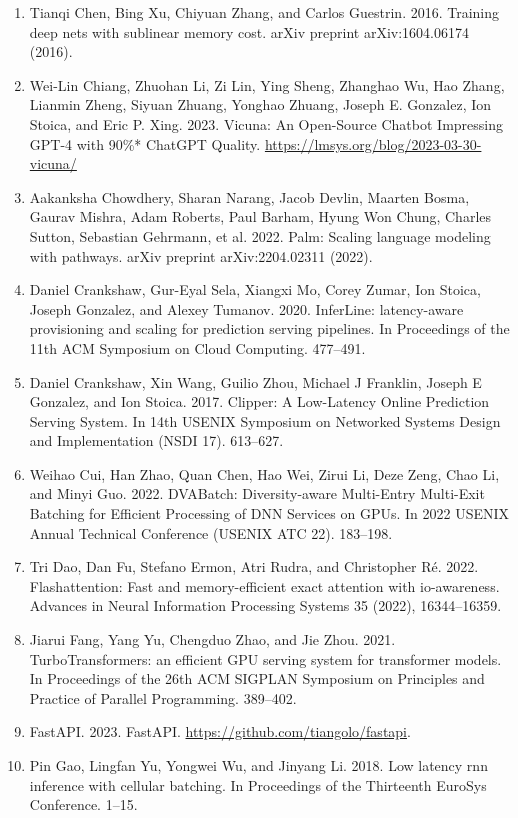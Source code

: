 \documentclass[11pt,UTF8,fontset=fandol]{ctexart}
\begin{document}
\begin{enumerate}[leftmargin=2.2em,labelsep=0.6em,itemsep=0.25em]
\item Tianqi Chen, Bing Xu, Chiyuan Zhang, and Carlos Guestrin. 2016. Training deep nets with sublinear memory cost. arXiv preprint arXiv:1604.06174 (2016).
\item Wei-Lin Chiang, Zhuohan Li, Zi Lin, Ying Sheng, Zhanghao Wu, Hao Zhang, Lianmin Zheng, Siyuan Zhuang, Yonghao Zhuang, Joseph E. Gonzalez, Ion Stoica, and Eric P. Xing. 2023. Vicuna: An Open-Source Chatbot Impressing GPT-4 with 90\%* ChatGPT Quality. \url{https://lmsys.org/blog/2023-03-30-vicuna/}
\item Aakanksha Chowdhery, Sharan Narang, Jacob Devlin, Maarten Bosma, Gaurav Mishra, Adam Roberts, Paul Barham, Hyung Won Chung, Charles Sutton, Sebastian Gehrmann, et al. 2022. Palm: Scaling language modeling with pathways. arXiv preprint arXiv:2204.02311 (2022).
\item Daniel Crankshaw, Gur-Eyal Sela, Xiangxi Mo, Corey Zumar, Ion Stoica, Joseph Gonzalez, and Alexey Tumanov. 2020. InferLine: latency-aware provisioning and scaling for prediction serving pipelines. In Proceedings of the 11th ACM Symposium on Cloud Computing. 477--491.
\item Daniel Crankshaw, Xin Wang, Guilio Zhou, Michael J Franklin, Joseph E Gonzalez, and Ion Stoica. 2017. Clipper: A Low-Latency Online Prediction Serving System. In 14th USENIX Symposium on Networked Systems Design and Implementation (NSDI 17). 613--627.
\item Weihao Cui, Han Zhao, Quan Chen, Hao Wei, Zirui Li, Deze Zeng, Chao Li, and Minyi Guo. 2022. DVABatch: Diversity-aware Multi-Entry Multi-Exit Batching for Efficient Processing of DNN Services on GPUs. In 2022 USENIX Annual Technical Conference (USENIX ATC 22). 183--198.
\item Tri Dao, Dan Fu, Stefano Ermon, Atri Rudra, and Christopher Ré. 2022. Flashattention: Fast and memory-efficient exact attention with io-awareness. Advances in Neural Information Processing Systems 35 (2022), 16344--16359.
\item Jiarui Fang, Yang Yu, Chengduo Zhao, and Jie Zhou. 2021. TurboTransformers: an efficient GPU serving system for transformer models. In Proceedings of the 26th ACM SIGPLAN Symposium on Principles and Practice of Parallel Programming. 389--402.
\item FastAPI. 2023. FastAPI. \url{https://github.com/tiangolo/fastapi}.
\item Pin Gao, Lingfan Yu, Yongwei Wu, and Jinyang Li. 2018. Low latency rnn inference with cellular batching. In Proceedings of the Thirteenth EuroSys Conference. 1--15.

\end{enumerate}
\end{document}
